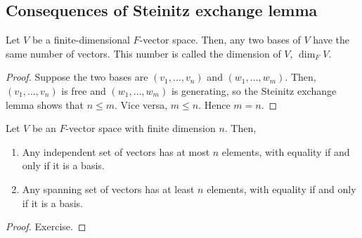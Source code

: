     \subsection{Consequences of Steinitz exchange lemma}
    \begin{corollary}
        Let $V$ be a finite-dimensional $F$-vector space.
        Then, any two bases of $V$ have the same number of vectors.
        This number is called the dimension of $V$, $\dim_F V$.
    \end{corollary}
    \begin{proof}
        Suppose the two bases are $(v_1, \dots, v_n)$ and $(w_1, \dots, w_m)$.
        Then, $(v_1, \dots, v_n)$ is free and $(w_1, \dots, w_m)$ is generating, so the Steinitz exchange lemma shows that $n \leq m$.
        Vice versa, $m \leq n$.
        Hence $m = n$.
    \end{proof}
    \begin{corollary}
        Let $V$ be an $F$-vector space with finite dimension $n$.
        Then,
        \begin{enumerate}
            \item Any independent set of vectors has at most $n$ elements, with equality if and only if it is a basis.
            \item Any spanning set of vectors has at least $n$ elements, with equality if and only if it is a basis.
        \end{enumerate}
    \end{corollary}
    \begin{proof}
        Exercise.
    \end{proof}

